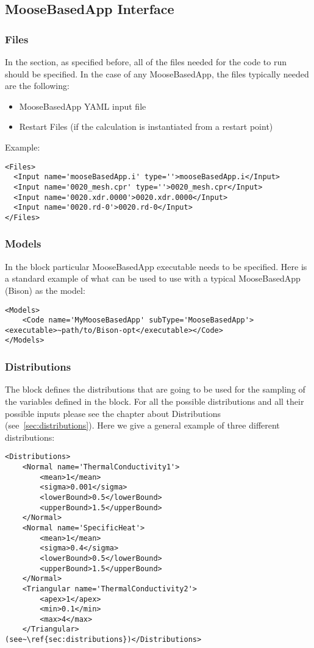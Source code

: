 \subsection{MooseBasedApp Interface}
\subsubsection{Files}
In the  section, as specified before, all of the files needed for
the code to run should be specified.
%
In the case of any MooseBasedApp, the files typically needed are the following:
\begin{itemize}
  \item MooseBasedApp YAML input file
  \item Restart Files (if the calculation is instantiated from a restart point)
\end{itemize}
Example:
\begin{lstlisting}[style=XML]
<Files>
  <Input name='mooseBasedApp.i' type=''>mooseBasedApp.i</Input>
  <Input name='0020_mesh.cpr' type=''>0020_mesh.cpr</Input>
  <Input name='0020.xdr.0000'>0020.xdr.0000</Input>
  <Input name='0020.rd-0'>0020.rd-0</Input>
</Files>
\end{lstlisting}
\subsubsection{Models}
In the  block particular MooseBasedApp executable needs to be specified.
%
Here is a standard example of what can be used to use with a typical MooseBasedApp (Bison) as the model:
\begin{lstlisting}[style=XML]
<Models>
    <Code name='MyMooseBasedApp' subType='MooseBasedApp'><executable>~path/to/Bison-opt</executable></Code>
</Models>
\end{lstlisting}
\subsubsection{Distributions}
The  block defines the distributions that are going
to be used for the sampling of the variables defined in the 
block.
%
For all the possible distributions and all their possible inputs please see the
chapter about Distributions (see~\ref{sec:distributions}).
%
Here we give a general example of three different distributions:
\begin{lstlisting}[style=XML,morekeywords={name,debug}]
<Distributions>
    <Normal name='ThermalConductivity1'>
        <mean>1</mean>
        <sigma>0.001</sigma>
        <lowerBound>0.5</lowerBound>
        <upperBound>1.5</upperBound>
    </Normal>
    <Normal name='SpecificHeat'>
        <mean>1</mean>
        <sigma>0.4</sigma>
        <lowerBound>0.5</lowerBound>
        <upperBound>1.5</upperBound>
    </Normal>
    <Triangular name='ThermalConductivity2'>
        <apex>1</apex>
        <min>0.1</min>
        <max>4</max>
    </Triangular>
(see~\ref{sec:distributions})</Distributions>
\end{lstlisting}

